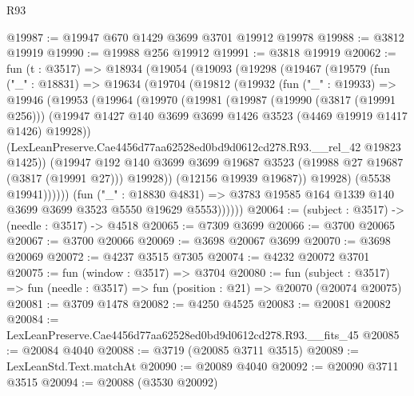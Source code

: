 \begin{lexlean}{R93}
\begin{coremodule}
@19987 := @19947 @670 @1429 @3699 @3701 @19912 @19978
@19988 := @3812 @19919
@19990 := @19988 @256 @19912
@19991 := @3818 @19919
@20062 := fun (t : @3517) =>
  @18934
    (@19054
      (@19093
        (@19298
          (@19467
            (@19579
              (fun ("_" : @18831) =>
              @19634
                (@19704
                  (@19812
                    (@19932
                      (fun ("_" : @19933) =>
                      @19946
                        (@19953
                          (@19964
                            (@19970
                              (@19981
                                (@19987
                                  (@19990 (@3817 (@19991 @256)))
                                  (@19947
                                    @1427
                                    @140
                                    @3699
                                    @3699
                                    @1426
                                    @3523
                                    (@4469 @19919 @1417 @1426)
                                    @19928))
                                (LexLeanPreserve.Cae4456d77aa62528ed0bd9d0612cd278.R93.__rel_42
                                  @19823
                                  @1425))
                              (@19947
                                @192
                                @140
                                @3699
                                @3699
                                @19687
                                @3523
                                (@19988 @27 @19687 (@3817 (@19991 @27)))
                                @19928))
                            (@12156 @19939 @19687))
                          @19928)
                        (@5538 @19941))))))
              (fun ("_" : @18830 @4831) =>
              @3783 @19585 @164 @1339 @140 @3699 @3699 @3523 @5550 @19629 @5553))))))
@20064 := (subject : @3517) -> (needle : @3517) -> @4518
@20065 := @7309 @3699
@20066 := @3700 @20065
@20067 := @3700 @20066
@20069 := @3698 @20067 @3699
@20070 := @3698 @20069
@20072 := @4237 @3515 @7305
@20074 := @4232 @20072 @3701
@20075 := fun (window : @3517) => @3704
@20080 := fun (subject : @3517) =>
  fun (needle : @3517) => fun (position : @21) => @20070 (@20074 @20075)
@20081 := @3709 @1478
@20082 := @4250 @4525
@20083 := @20081 @20082
@20084 := LexLeanPreserve.Cae4456d77aa62528ed0bd9d0612cd278.R93.__fits_45
@20085 := @20084 @4040
@20088 := @3719 (@20085 @3711 @3515)
@20089 := LexLeanStd.Text.matchAt
@20090 := @20089 @4040
@20092 := @20090 @3711 @3515
@20094 := @20088 (@3530 @20092)

\end{coremodule}
\end{lexlean}
